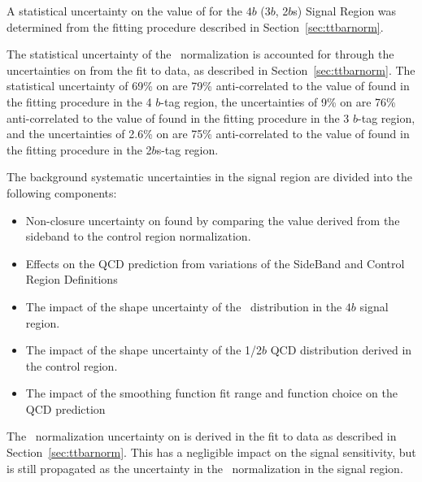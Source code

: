 A statistical uncertainty on the value of \muqcd for the $4b$ ($3b$, 2$b$s) Signal Region was determined from the fitting procedure described in Section~\ref{sec:ttbarnorm}. 

The statistical uncertainty of the \ttbar\ normalization is accounted for through the uncertainties on \alphatt from the fit to data, as described in Section~\ref{sec:ttbarnorm}. The statistical uncertainty of 69\% on \alphatt are 79\% anti-correlated to the value of \muqcd found in the fitting procedure in the 4 $b$-tag region, the uncertainties of 9\% on \alphatt are 76\% anti-correlated to the value of \muqcd found in the fitting procedure in the 3 $b$-tag region, and the uncertainties of 2.6\% on \alphatt are 75\% anti-correlated to the value of \muqcd found in the fitting procedure in the 2$b$s-tag region.

The background systematic uncertainties in the signal region are divided into the following components:
\begin{itemize}
 \item Non-closure uncertainty on \muqcd found by comparing the value derived from the sideband to the control region normalization.
 \item Effects on the QCD prediction from variations of the SideBand and Control Region Definitions
 \item The impact of the shape uncertainty of the \ttbar\ distribution in the $4b$ signal region.
 \item The impact of the shape uncertainty of the 1/2$b$ QCD distribution derived in the control region.
 \item The impact of the smoothing function fit range and function choice on the QCD prediction
\end{itemize}

The \ttbar\ normalization uncertainty on \alphatt is derived in the fit to data as described in Section~\ref{sec:ttbarnorm}. This has a negligible impact on the signal sensitivity, but is still propagated as the uncertainty in the \ttbar\ normalization in the signal region.

